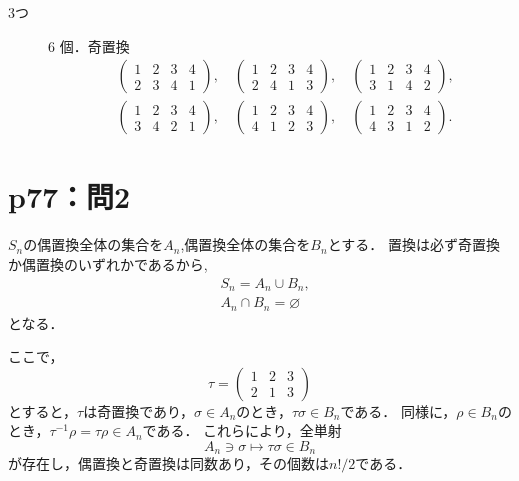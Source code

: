 \begin{tanswer}
\begin{description}
    \item[3つ] 6 個．奇置換
          \begin{align*}
             & \begin{pmatrix} 1 & 2 & 3 & 4 \\ 2 & 3 & 4 & 1 \end{pmatrix},\quad
            \begin{pmatrix} 1 & 2 & 3 & 4 \\ 2 & 4 & 1 & 3 \end{pmatrix},\quad
            \begin{pmatrix} 1 & 2 & 3 & 4 \\ 3 & 1 & 4 & 2 \end{pmatrix},         \\
             & \begin{pmatrix} 1 & 2 & 3 & 4 \\ 3 & 4 & 2 & 1 \end{pmatrix},\quad
            \begin{pmatrix} 1 & 2 & 3 & 4 \\ 4 & 1 & 2 & 3 \end{pmatrix},\quad
            \begin{pmatrix} 1 & 2 & 3 & 4 \\ 4 & 3 & 1 & 2 \end{pmatrix}.
          \end{align*}
  \end{description}
\end{tanswer}

\section*{p77：問2}

\begin{tproof}
  $S_n$の偶置換全体の集合を$A_n$,偶置換全体の集合を$B_n$とする．
  置換は必ず奇置換か偶置換のいずれかであるから,
  \begin{align*}
     & S_n = A_n \cup B_n ,       \\
     & A_n \cap B_n = \varnothing
  \end{align*}
  となる．

  ここで，
  \[
    \tau = \begin{pmatrix} 1 & 2 & 3 \\ 2 & 1 & 3 \end{pmatrix}
  \]
  とすると，$\tau$は奇置換であり，$\sigma \in  A_n$のとき，$ \tau \sigma \in B_n$である．
  同様に，$ \rho  \in B_n$のとき，$\tau^{-1} \rho = \tau \rho \in A_n$である．
  これらにより，全単射
  \[
    A_n \ni \sigma \mapsto \tau \sigma \in B_n
  \]
  が存在し，偶置換と奇置換は同数あり，その個数は$n! /2$である．
\end{tproof}


